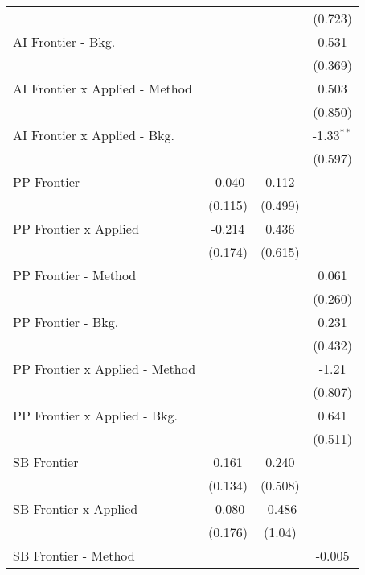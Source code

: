 \begin{tabular}{lccc}
                                  &               &         & (0.723)\\   
   AI Frontier - Bkg.             &               &         & 0.531\\   
                                  &               &         & (0.369)\\   
   AI Frontier x Applied - Method &               &         & 0.503\\   
                                  &               &         & (0.850)\\   
   AI Frontier x Applied - Bkg.   &               &         & -1.33$^{**}$\\   
                                  &               &         & (0.597)\\   
   PP Frontier                    & -0.040        & 0.112   &   \\   
                                  & (0.115)       & (0.499) &   \\   
   PP Frontier x Applied          & -0.214        & 0.436   &   \\   
                                  & (0.174)       & (0.615) &   \\   
   PP Frontier - Method           &               &         & 0.061\\   
                                  &               &         & (0.260)\\   
   PP Frontier - Bkg.             &               &         & 0.231\\   
                                  &               &         & (0.432)\\   
   PP Frontier x Applied - Method &               &         & -1.21\\   
                                  &               &         & (0.807)\\   
   PP Frontier x Applied - Bkg.   &               &         & 0.641\\   
                                  &               &         & (0.511)\\   
   SB Frontier                    & 0.161         & 0.240   &   \\   
                                  & (0.134)       & (0.508) &   \\   
   SB Frontier x Applied          & -0.080        & -0.486  &   \\   
                                  & (0.176)       & (1.04)  &   \\   
   SB Frontier - Method           &               &         & -0.005\\   

\end{tabular}
